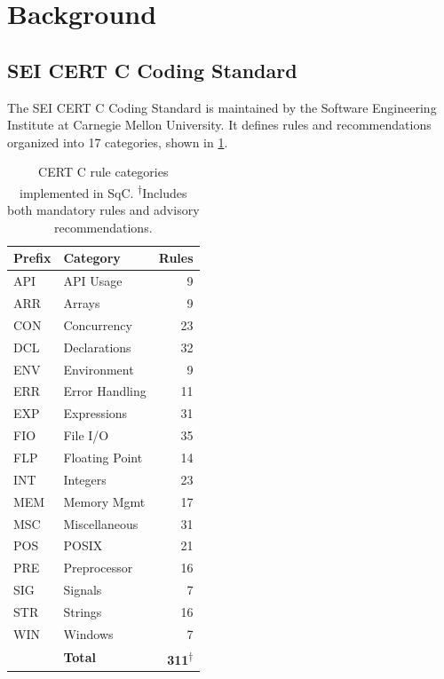 \section{Background}
\label{sec:background}

\subsection{SEI CERT C Coding Standard}

The SEI CERT C Coding Standard is maintained by the Software
Engineering Institute at Carnegie Mellon University.  It defines rules
and recommendations organized into 17 categories, shown in
\cref{tab:cert-categories}.

\begin{table}[t]
\centering
\footnotesize
\begin{tabular}{@{}llr@{}}
\toprule
\textbf{Prefix} & \textbf{Category} & \textbf{Rules} \\
\midrule
API & API Usage & 9 \\
ARR & Arrays & 9 \\
CON & Concurrency & 23 \\
DCL & Declarations & 32 \\
ENV & Environment & 9 \\
ERR & Error Handling & 11 \\
EXP & Expressions & 31 \\
FIO & File I/O & 35 \\
FLP & Floating Point & 14 \\
INT & Integers & 23 \\
MEM & Memory Mgmt & 17 \\
MSC & Miscellaneous & 31 \\
POS & POSIX & 21 \\
PRE & Preprocessor & 16 \\
SIG & Signals & 7 \\
STR & Strings & 16 \\
WIN & Windows & 7 \\
\midrule
& \textbf{Total} & \textbf{311}\textsuperscript{$\dagger$} \\
\bottomrule
\end{tabular}
\caption{CERT C rule categories implemented in SqC.
\textsuperscript{$\dagger$}Includes both mandatory rules and advisory
recommendations.}
\label{tab:cert-categories}
\end{table}


